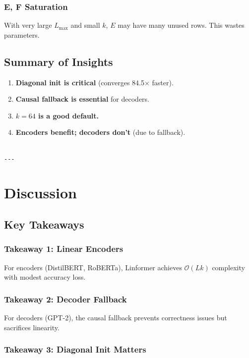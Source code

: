 \subsubsection{E, F Saturation}

With very large $L_\text{max}$ and small $k$, $E$ may have many unused rows. 
This wastes parameters.

\subsection{Summary of Insights}

\begin{enumerate}
\item \textbf{Diagonal init is critical} (converges 84.5$\times$ faster).
\item \textbf{Causal fallback is essential} for decoders.
\item \textbf{$k = 64$ is a good default.}
\item \textbf{Encoders benefit; decoders don't} (due to fallback).
\end{enumerate}
\begin{lstlisting}

---
\end{lstlisting}

\section{Discussion}

\subsection{Key Takeaways}

\subsubsection{Takeaway 1: Linear Encoders}

For encoders (DistilBERT, RoBERTa), Linformer achieves $\mathcal{O}(L k)$ 
complexity with modest accuracy loss.

\subsubsection{Takeaway 2: Decoder Fallback}

For decoders (GPT-2), the causal fallback prevents correctness issues but 
sacrifices linearity.

\subsubsection{Takeaway 3: Diagonal Init Matters}

